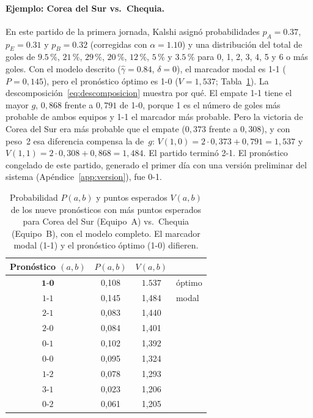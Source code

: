 \documentclass[12pt]{article}
\theoremstyle{plain}
\theoremstyle{remark}
\begin{document}
\paragraph{Ejemplo: Corea del Sur vs.\ Chequia.}
En este partido de la primera jornada, Kalshi asignó probabilidades
$p_A = 0.37$, $p_E = 0.31$ y $p_B = 0.32$ (corregidas con
$\alpha = 1.10$) y una distribución del total de goles de
$9.5\,\%$, $21\,\%$, $29\,\%$, $20\,\%$, $12\,\%$, $5\,\%$ y
$3.5\,\%$ para 0, 1, 2, 3, 4, 5 y 6 o más goles.
Con el modelo descrito ($\hat\gamma = 0.84$, $\delta = 0$), el
marcador modal es 1-1 ($P = 0{,}145$), pero el pronóstico óptimo es 1-0
($V = 1{,}537$; Tabla~\ref{tab:ejkorcze}).
La descomposición~\eqref{eq:descomposicion} muestra por qué.
El empate 1-1 tiene el mayor $g$, $0{,}868$ frente a $0{,}791$ de 1-0,
porque 1 es el número de goles más probable de ambos equipos y 1-1 el
marcador más probable.
Pero la victoria de Corea del Sur era más probable que el empate
($0{,}373$ frente a $0{,}308$), y con peso~2 esa diferencia compensa
la de~$g$: $V(1, 0) = 2 \cdot 0{,}373 + 0{,}791 = 1{,}537$ y
$V(1, 1) = 2 \cdot 0{,}308 + 0{,}868 = 1{,}484$.
El partido terminó 2-1.
El pronóstico congelado de este partido, generado el primer día con
una versión preliminar del sistema (Apéndice~\ref{app:version}), fue
0-1.

\begin{table}[tb]
\centering
\caption{Probabilidad $P(a,b)$ y puntos esperados $V(a,b)$ de los nueve
pronósticos con más puntos esperados para Corea del Sur (Equipo~A)
vs.\ Chequia (Equipo~B), con el modelo completo. El marcador modal
(1-1) y el pronóstico óptimo (1-0) difieren.}
\label{tab:ejkorcze}
\begin{tabular}{cccl}
\toprule
Pronóstico $(a,b)$ & $P(a,b)$ & $V(a,b)$ & \\
\midrule
$\mathbf{1\text{-}0}$ & 0,108 & $\mathbf{1.537}$ & óptimo \\
$1\text{-}1$ & 0,145 & 1,484 & modal \\
$2\text{-}1$ & 0,083 & 1,440 & \\
$2\text{-}0$ & 0,084 & 1,401 & \\
$0\text{-}1$ & 0,102 & 1,392 & \\
$0\text{-}0$ & 0,095 & 1,324 & \\
$1\text{-}2$ & 0,078 & 1,293 & \\
$3\text{-}1$ & 0,023 & 1,206 & \\
$0\text{-}2$ & 0,061 & 1,205 & \\
\bottomrule
\end{tabular}
\end{table}
\end{document}
